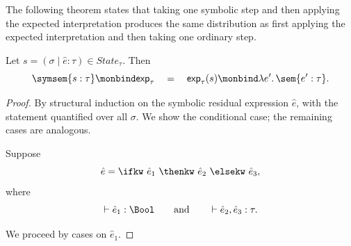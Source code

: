 The following theorem states that taking one symbolic step and then applying the expected interpretation produces the same distribution as first applying the expected interpretation and then taking one ordinary step.

\begin{theorem}
  \label{thm:expected-symbolic-step}
  Let $s=(\sigma \mid \hat e : \tau) \in State_\tau$.
  Then
  \[
    \symsem{s : \tau}
    \monbind
    \mathsf{exp}_\tau
    \quad 
    = 
    \quad
    \mathsf{exp}_\tau(s)
    \monbind
    \lambda e'.\,\sem{e' : \tau}.
  \]
\end{theorem}

\begin{proof}
  By structural induction on the symbolic residual expression $\hat e$,
  with the statement quantified over all $\sigma$. We show the conditional
  case; the remaining cases are analogous.

  Suppose
  \[
    \hat e
    =
    \ifkw\ \hat e_1\ \thenkw\ \hat e_2\ \elsekw\ \hat e_3,
  \]
  where
  \[
    \vdash \hat e_1 : \Bool
    \qquad\text{and}\qquad
    \vdash \hat e_2,\hat e_3 : \tau.
  \]

  We proceed by cases on $\hat e_1$.


\end{proof}
